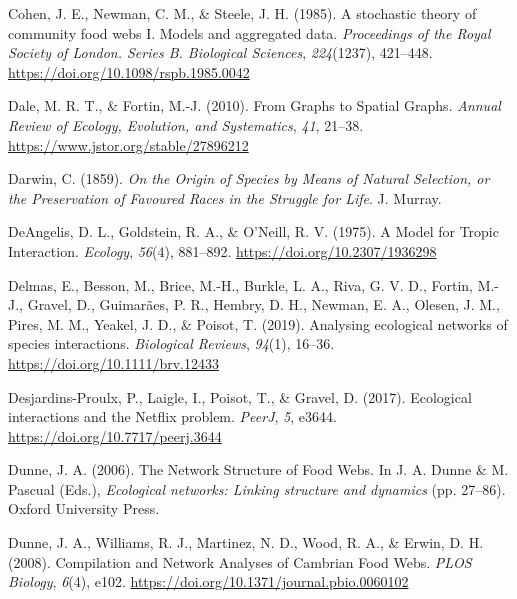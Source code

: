 \documentclass[
]{article}
\newlength{\cslhangindent}
\newenvironment{CSLReferences}[2] %
 {\begin{list}{}{%
  \setlength{\itemindent}{0pt}
  \setlength{\leftmargin}{0pt}
  \setlength{\parsep}{0pt}
  \ifodd #1
   \setlength{\leftmargin}{\cslhangindent}
   \setlength{\itemindent}{-1\cslhangindent}
  \fi
  \setlength{\itemsep}{#2\baselineskip}}}
 {\end{list}}
\begin{document}
\begin{CSLReferences}{1}{0}
Cohen, J. E., Newman, C. M., \& Steele, J. H. (1985). A stochastic
theory of community food webs {I}. {Models} and aggregated data.
\emph{Proceedings of the Royal Society of London. Series B. Biological
Sciences}, \emph{224}(1237), 421--448.
\url{https://doi.org/10.1098/rspb.1985.0042}

Dale, M. R. T., \& Fortin, M.-J. (2010). From {Graphs} to {Spatial
Graphs}. \emph{Annual Review of Ecology, Evolution, and Systematics},
\emph{41}, 21--38. \url{https://www.jstor.org/stable/27896212}

Darwin, C. (1859). \emph{On the {Origin} of {Species} by {Means} of
{Natural Selection}, or the {Preservation} of {Favoured Races} in the
{Struggle} for {Life}}. J. Murray.

DeAngelis, D. L., Goldstein, R. A., \& O'Neill, R. V. (1975). A {Model}
for {Tropic Interaction}. \emph{Ecology}, \emph{56}(4), 881--892.
\url{https://doi.org/10.2307/1936298}

Delmas, E., Besson, M., Brice, M.-H., Burkle, L. A., Riva, G. V. D.,
Fortin, M.-J., Gravel, D., Guimarães, P. R., Hembry, D. H., Newman, E.
A., Olesen, J. M., Pires, M. M., Yeakel, J. D., \& Poisot, T. (2019).
Analysing ecological networks of species interactions. \emph{Biological
Reviews}, \emph{94}(1), 16--36. \url{https://doi.org/10.1111/brv.12433}

Desjardins-Proulx, P., Laigle, I., Poisot, T., \& Gravel, D. (2017).
Ecological interactions and the {Netflix} problem. \emph{PeerJ},
\emph{5}, e3644. \url{https://doi.org/10.7717/peerj.3644}

Dunne, J. A. (2006). The {Network Structure} of {Food Webs}. In J. A.
Dunne \& M. Pascual (Eds.), \emph{Ecological networks: {Linking}
structure and dynamics} (pp. 27--86). Oxford University Press.

Dunne, J. A., Williams, R. J., Martinez, N. D., Wood, R. A., \& Erwin,
D. H. (2008). Compilation and {Network Analyses} of {Cambrian Food
Webs}. \emph{PLOS Biology}, \emph{6}(4), e102.
\url{https://doi.org/10.1371/journal.pbio.0060102}


\end{CSLReferences}
\end{document}
